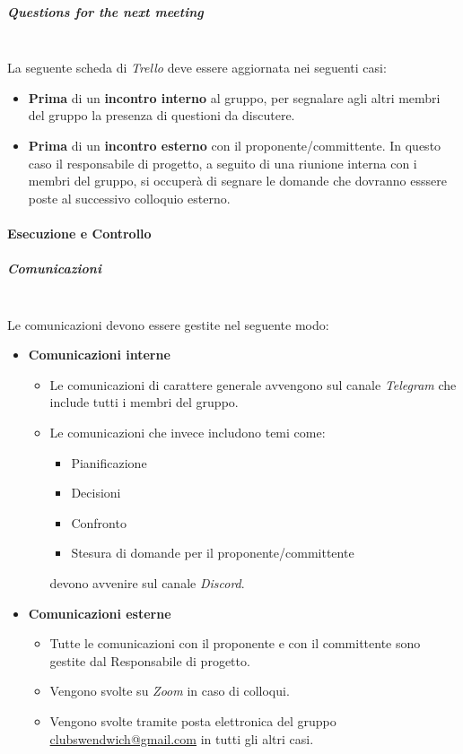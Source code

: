 \subparagraph{Questions for the next meeting}
\mbox{}\\
La seguente scheda di \textit{Trello} deve essere aggiornata nei seguenti casi:
\begin{itemize}
    \item \textbf{Prima} di un \textbf{incontro interno} al gruppo, per segnalare agli altri membri del gruppo
    la presenza di questioni da discutere.
    \item \textbf{Prima} di un \textbf{incontro esterno} con il proponente/committente. In questo caso il responsabile
    di progetto, a seguito di una riunione interna con i membri del gruppo, si occuperà di segnare le
    domande che dovranno esssere poste al successivo colloquio esterno.
\end{itemize}

\paragraph{Esecuzione e Controllo}

\subparagraph{Comunicazioni}
\mbox{}\\

Le comunicazioni devono essere gestite nel seguente modo:
\begin{itemize}
    \item \textbf{Comunicazioni interne}
    \begin{itemize}
        \item Le comunicazioni di carattere generale avvengono sul canale \textit{Telegram}
        che include tutti i membri del gruppo.
        \item Le comunicazioni che invece includono temi come: 
        \begin{itemize}
            \item Pianificazione
            \item Decisioni
            \item Confronto
            \item Stesura di domande per il proponente/committente
        \end{itemize}
        devono avvenire sul canale \textit{Discord}.
    \end{itemize}
    \item \textbf{Comunicazioni esterne}
    \begin{itemize}
        \item Tutte le comunicazioni con il proponente e con il committente sono gestite dal Responsabile di progetto.
        \item Vengono svolte su \textit{Zoom} in caso di colloqui.
        \item Vengono svolte tramite posta elettronica del gruppo \href{mailto:clubswendwich@gmail.com}{clubswendwich@gmail.com} in tutti gli altri casi.
    \end{itemize}
\end{itemize}

